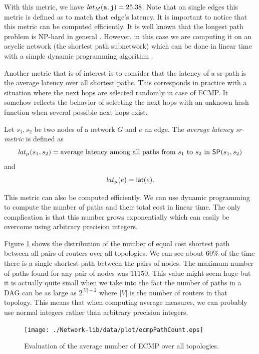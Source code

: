 With this metric, we have $\mathit{lat}_\mathit{M}(\texttt{a}, \texttt{j}) = 25.38$. Note that on single edges this metric is defined as to
match that edge's latency. It is important to notice that this metric can be computed efficiently. It is well known that the
longest path problem is \textsf{NP}-hard in general \cite{Cormen:2009:IAT:1614191}. However, in this case we are computing it on an
acyclic network (the shortest path subnetwork) which can be done in linear time with a simple dynamic programming algorithm \cite{Cormen:2009:IAT:1614191}.

Another metric that is of interest is to consider that the latency of a sr-path is the average latency over all shortest paths.
This corresponds in practice with a situation where the next hops are selected randomly in case of ECMP. It somehow
reflects the behavior of selecting the next hops with an unknown hash function when several possible next hops exist.

\begin{definition}
Let $s_1, s_2$ be two nodes of a network $G$ and $e$ an edge.
The \emph{average latency sr-metric} is defined as
$$
\mathit{lat}_\mu(s_1, s_2) = \textrm{average latency among all paths from $s_1$ to $s_2$ in $\mathsf{SP}(s_1, s_2)$} 
$$
and
$$
\mathit{lat}_\mu(e) = \mathsf{lat}(e).
$$
\end{definition}

This metric can also be computed efficiently. We can use dynamic programming to compute the number of paths and their total
cost in linear time. The only complication is that this number grows exponentially which can easily be overcome using 
arbitrary precision integers.

Figure \ref{fig:ecmp_pc} shows the distribution of the number of equal cost shortest path between all pairs of routers over
all topologies. We can see about $60$\% of the time there is a single shortest path between the pairs of nodes. 
The maximum number of paths found for any pair of nodes was $11150$. This value might seem huge but it is actually quite small
when we take into the fact the number of paths in a DAG can be as large as $2^{|V| - 2}$ where $|V|$ is the number of routers in
that topology. This means that when computing average measures, we can probably use normal integers rather than arbitrary precision integers.

\begin{figure}
\begin{center}
\texttt{[image: ./Network-lib/data/plot/ecmpPathCount.eps]}
\end{center}
\caption{Evaluation of the average number of ECMP over all topologies.}
\label{fig:ecmp_pc}
\end{figure}

